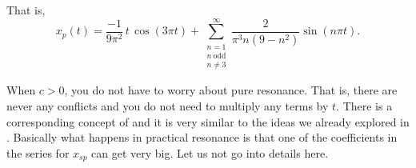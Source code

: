 \documentclass{ximera}
\begin{document}
\begin{exampleSol}
    That is,
    \begin{equation*}
        x_p(t) = \frac{-1}{9\pi^2} \, t \, \cos (3 \pi t) + \sum_{\substack{n=1 \\ n~\text{odd} \\ n\not= 3}}^\infty \frac{2}{\pi^3 n(9 - n^2)} \sin (n \pi t) . 
    \end{equation*}
\end{exampleSol}

When $c > 0$, you do not have to worry about pure resonance.  That is, there are never any conflicts and you do not need to multiply any terms by $t$.  There is a corresponding concept of  and it is very similar to the ideas we already explored in . Basically what happens in practical resonance is that one of the coefficients in the series for $x_{sp}$ can get very big.  Let us not go into details here.
\end{document}
